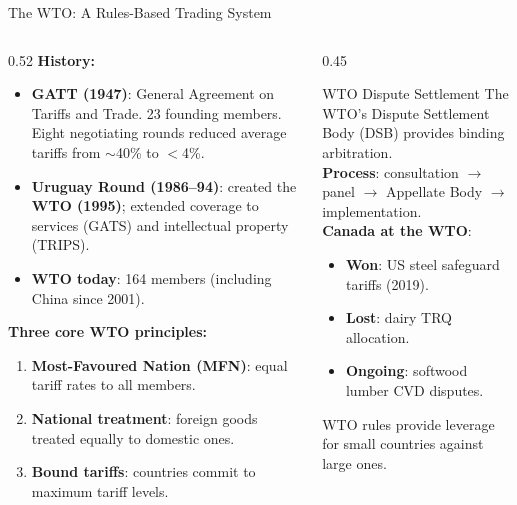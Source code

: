 \documentclass[aspectratio=169]{beamer}
\begin{document}
\begin{frame}{The WTO: A Rules-Based Trading System}
\begin{columns}
\begin{column}{0.52\textwidth}
\textbf{History:}
\begin{itemize}
  \item \textbf{GATT (1947)}: General Agreement on Tariffs and Trade. 23 founding members. Eight negotiating rounds reduced average tariffs from $\sim$40\% to $<$4\%.
  \item \textbf{Uruguay Round (1986--94)}: created the \textbf{WTO (1995)}; extended coverage to services (GATS) and intellectual property (TRIPS).
  \item \textbf{WTO today}: 164 members (including China since 2001).
\end{itemize}
\vspace{0.2em}
\textbf{Three core WTO principles:}
\begin{enumerate}
  \item \textbf{Most-Favoured Nation (MFN)}: equal tariff rates to all members.
  \item \textbf{National treatment}: foreign goods treated equally to domestic ones.
  \item \textbf{Bound tariffs}: countries commit to maximum tariff levels.
\end{enumerate}
\end{column}
\begin{column}{0.45\textwidth}
\begin{block}{WTO Dispute Settlement}
  The WTO's Dispute Settlement Body (DSB) provides binding arbitration.\\[0.3em]
  \textbf{Process}: consultation $\to$ panel $\to$ Appellate Body $\to$ implementation.\\[0.3em]
  \textbf{Canada at the WTO}:
  \begin{itemize}\small
    \item \textbf{Won}: US steel safeguard tariffs (2019).
    \item \textbf{Lost}: dairy TRQ allocation.
    \item \textbf{Ongoing}: softwood lumber CVD disputes.
  \end{itemize}
  WTO rules provide leverage for small countries against large ones.
\end{block}
\end{column}
\end{columns}
\end{frame}
\end{document}
